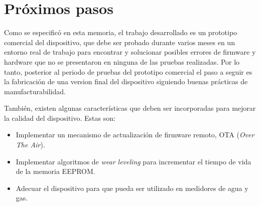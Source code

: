 \section{Próximos pasos}

Como se especificó en esta memoria, el trabajo desarrollado es un prototipo comercial del dispositivo, que debe ser probado durante varios meses en un entorno real de trabajo para encontrar y solucionar posibles errores de firmware y hardware que no se presentaron en ninguna de las pruebas realizadas. Por lo tanto, posterior al periodo de pruebas del prototipo comercial el paso a seguir es la fabricación de una version final del dispositivo siguiendo buenas prácticas de manufacturabilidad.

También, existen algunas características que deben ser incorporadas para mejorar la calidad del dispositivo. Estas son:

\begin{itemize}
	\item Implementar un mecanismo de actualización de firmware remoto, OTA (\textit{Over The Air}).
	\item Implementar algoritmos de \textit{wear leveling} para incrementar el tiempo de
	 vida de la memoria EEPROM.
	\item Adecuar el dispositivo para que pueda ser utilizado en medidores de agua y gas.
\end{itemize}
